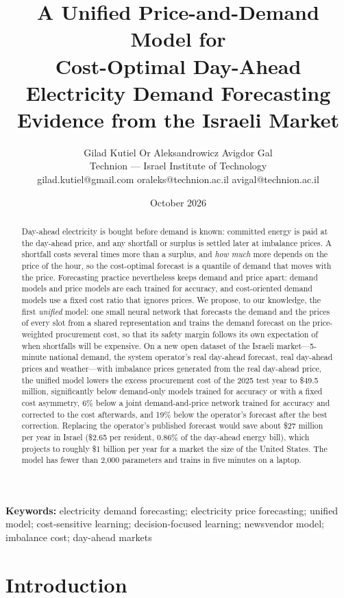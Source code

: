 \documentclass[12pt,a4paper]{article}
\title{\textbf{A Unified Price-and-Demand Model for\\
Cost-Optimal Day-Ahead Electricity Demand Forecasting}\\[0.6em]
\large Evidence from the Israeli Market}
\author{Gilad Kutiel \quad Or Aleksandrowicz \quad Avigdor Gal  \\[0.6em]
\normalsize Technion --- Israel Institute of Technology \\[0.3em]
\footnotesize\ttfamily gilad.kutiel@gmail.com \quad oraleks@technion.ac.il \quad avigal@technion.ac.il}
\date{October 2026}
\begin{document}
\maketitle

\begin{abstract}
Day-ahead electricity is bought before demand is known: committed energy is
paid at the day-ahead price, and any shortfall or surplus is settled later at
imbalance prices.  A shortfall costs several times more than a surplus, and
\emph{how much} more depends on the price of the hour, so the cost-optimal
forecast is a quantile of demand that moves with the price.  Forecasting
practice nevertheless keeps demand and price apart: demand models and price
models are each trained for accuracy, and cost-oriented demand models use a
fixed cost ratio that ignores prices.  We propose, to our knowledge, the first
\emph{unified} model: one small neural network that forecasts the demand and
the prices of every slot from a shared representation and trains the demand
forecast on the price-weighted procurement cost, so that its safety margin
follows its own expectation of when shortfalls will be expensive.  On a new
open dataset of the Israeli market---5-minute national demand, the system
operator's real day-ahead forecast, real day-ahead prices and weather---with
imbalance prices generated from the real day-ahead price, the unified model
lowers the excess procurement cost of the 2025 test year to \$49.5 million,
significantly below demand-only models trained for accuracy or with a fixed
cost asymmetry, 6\% below a joint demand-and-price network trained for
accuracy and corrected to the cost afterwards, and 19\% below the operator's
forecast after the best correction.  Replacing the operator's published
forecast would save about \$27 million per year in Israel (\$2.65 per
resident, 0.86\% of the day-ahead energy bill), which projects to roughly
\$1 billion per year for a market the size of the United States.  The model has
fewer than 2{,}000 parameters and trains in five minutes on a laptop.
\end{abstract}

\noindent\textbf{Keywords:} electricity demand forecasting; electricity price
forecasting; unified model; cost-sensitive learning; decision-focused
learning; newsvendor model; imbalance cost; day-ahead markets

\section{Introduction}\label{sec:intro}

\end{document}
